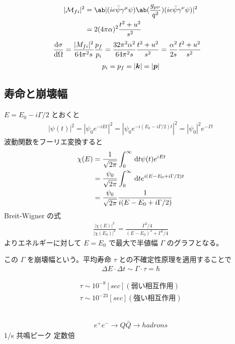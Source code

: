 \documentclass[a4paper,11pt]{jlreq}
\begin{document}
\begin{align}
  |\mathcal{M}_{fi}|^2 & = \ab|(ie\bar\psi\gamma^\mu\psi)\ab(\frac{g_{\mu\nu}}{q^2})(ie\bar\psi\gamma^\nu\psi)|^2 \\
                       & = 2(4\pi\alpha)^2\frac{t^2 + u^2}{s^2}
\end{align}
\begin{align}
  \diff{\sigma}{\Omega} & = \frac{|M_{fi}|^2}{64\pi^2s}\frac{p_f}{p_i} = \frac{32\pi^2\alpha^2}{64\pi^2 s}\frac{t^2 + u^2}{s^2} = \frac{\alpha^2}{2s}\frac{t^2 + u^2}{s^2}
\end{align}
\begin{align}
  p_i = p_f = |\bm{k}| = |\bm{p}|
\end{align}


\subsection{寿命と崩壊幅}
$E = E_0 - i\Gamma/2$ とおくと
\begin{align}
  |\psi(t)|^2 = |\psi_0 e^{-iEt}|^2 = |\psi_0 e^{-i(E_0 - i\Gamma/2)t}|^2 = |\psi_0|^2e^{-\Gamma t}
\end{align}
波動関数をフーリエ変換すると
\begin{align}
  \chi(E) & = \frac{1}{\sqrt{2\pi}}\int_0^\infty \dl{t}\psi(t)e^{iEt}                   \\
          & = \frac{\psi_0}{\sqrt{2\pi}}\int_0^\infty \dl{t}e^{i(E - E_0 + i\Gamma/2)t} \\
          & = \frac{\psi_0}{\sqrt{2\pi}}\frac{1}{i(E - E_0 + i\Gamma/2)}
\end{align}
Breit-Wigner の式
\begin{align}
  \frac{|\chi(E)|^2}{|\chi(E_0)|^2} = \frac{\Gamma^2/4}{(E - E_0)^2 + \Gamma^2/4}
\end{align}
よりエネルギーに対して $E = E_0$ で最大で半値幅 $\Gamma$ のグラフとなる。

この $\Gamma$ を崩壊幅という。平均寿命 $\tau$ との不確定性原理を適用することで
\begin{align}
  \Delta E\cdot \Delta t \sim \Gamma \cdot \tau = \hbar
\end{align}

\begin{align}
  \tau \sim 10^{-8} [\si{sec}] (弱い相互作用) \\
  \tau \sim 10^{-23} [\si{sec}] (強い相互作用)
\end{align}

\subsection{}
\begin{align}
  e^+e^- \to Q\bar Q \to hadrons
\end{align}
1/s
共鳴ピーク
定数倍
\end{document}
